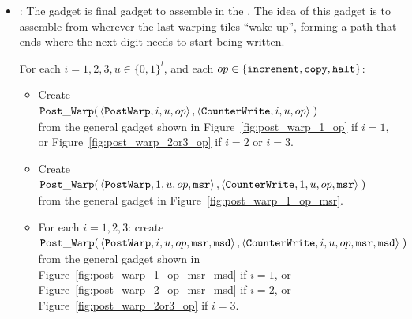 \begin{itemize}
    \item {\postwarp}: The {\postwarp} gadget is final gadget to assemble in the {\warpunit}. The idea of this
    gadget is to assemble from wherever the last warping tiles ``wake up'', forming a path that ends where the
    next digit needs to start being written.

    For each $i = 1,2,3, u \in \{0, 1\}^l$, and each $op \in \{ {\tt increment}, {\tt copy}, {\tt halt} \}$:
    \begin{itemize}
       \item Create\\
        $\begin{aligned}[t]
            \postwarp(& \left \langle {\tt PostWarp},     i, u, \inc \right\rangle,    %
                        \left \langle {\tt CounterWrite}, i, u, \inc \right\rangle \;) %
        \end{aligned}$ \\
        from the general gadget shown in Figure~\ref{fig:post_warp_1_op} if $i = 1$,
        or Figure~\ref{fig:post_warp_2or3_op} if $ i = 2$ or $i = 3$.
        \vspace{.5cm}


        \item Create
        $\begin{aligned}[t]
            \postwarp(& \left \langle {\tt PostWarp},     1, u, \inc, {\tt msr} \right\rangle,    %
                        \left \langle {\tt CounterWrite}, 1, u, \inc, {\tt msr} \right\rangle \;) %
        \end{aligned}$ \\
        from the general gadget in Figure~\ref{fig:post_warp_1_op_msr}.
        \vspace{.5cm}

        \item For each $i=1,2,3$: create\\
        $\begin{aligned}[t]
            \postwarp(& \left \langle {\tt PostWarp},     i, u, \inc, {\tt msr}, {\tt msd} \right\rangle,    %
                        \left \langle {\tt CounterWrite}, i, u, \inc, {\tt msr}, {\tt msd} \right\rangle \;) %
        \end{aligned}$ \\
        from the general gadget shown in Figure~\ref{fig:post_warp_1_op_msr_msd} if $i = 1$, or
        Figure~\ref{fig:post_warp_2_op_msr_msd} if $i = 2$, or Figure~\ref{fig:post_warp_2or3_op} if $i = 3$.
        \vspace{.5cm}


\end{itemize}
\end{itemize}
